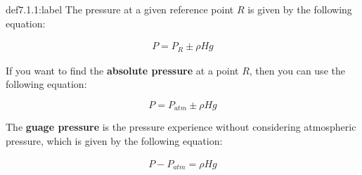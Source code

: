 \begin{definition}{def7.1.1:label}
    The pressure at a given reference point $R$ is given by the following equation:

    \[
    \begin{aligned}
        P = P_R \pm \rho Hg
    \end{aligned}    
    \]

    If you want to find the \textbf{absolute pressure} at a point $R$, then you can use the following equation:

    \[
    P = P_{atm} \pm \rho Hg    
    \]

    The \textbf{guage pressure} is the pressure experience without considering atmospheric pressure, which is given by the following equation:

    \[
    \begin{aligned}
        P - P_{atm} = \rho Hg
    \end{aligned}    
    \]
\end{definition}